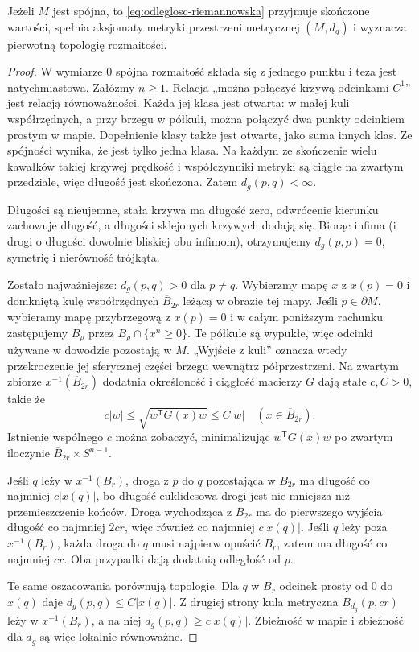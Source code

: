 \begin{twierdzenie}
\label{thm:odleglosc-jest-metryka}
Jeżeli $M$ jest spójna, to \eqref{eq:odleglosc-riemannowska}
przyjmuje skończone wartości, spełnia aksjomaty
metryki przestrzeni metrycznej $(M,d_g)$
i wyznacza pierwotną topologię rozmaitości.
\end{twierdzenie}
\begin{proof}
W wymiarze $0$ spójna rozmaitość składa się z jednego
punktu i teza jest natychmiastowa. Załóżmy $n\geq1$.
Relacja „można połączyć krzywą odcinkami $C^1$” jest
relacją równoważności. Każda jej klasa jest otwarta:
w małej kuli współrzędnych, a przy brzegu w półkuli,
można połączyć dwa punkty odcinkiem prostym w mapie.
Dopełnienie klasy także jest otwarte, jako suma innych
klas. Ze spójności wynika, że jest tylko jedna klasa.
Na każdym ze skończenie wielu kawałków takiej krzywej
prędkość i współczynniki metryki są ciągłe na zwartym
przedziale, więc długość jest skończona.
Zatem $d_g(p,q)<\infty$.

Długości są nieujemne, stała krzywa ma
długość zero, odwrócenie kierunku zachowuje
długość, a długości sklejonych krzywych
dodają się. Biorąc infima (i drogi o długości
dowolnie bliskiej obu infimom), otrzymujemy
$d_g(p,p)=0$, symetrię i nierówność trójkąta.

Zostało najważniejsze: $d_g(p,q)>0$ dla $p\ne q$.
Wybierzmy mapę $x$ z $x(p)=0$ i domkniętą
kulę współrzędnych $\overline B_{2r}$ leżącą
w obrazie tej mapy. Jeśli $p\in\partial M$, wybieramy
mapę przybrzegową z $x(p)=0$ i w całym poniższym
rachunku zastępujemy $B_\rho$ przez
$B_\rho\cap\{x^n\geq0\}$. Te półkule są wypukłe,
więc odcinki używane w dowodzie pozostają w $M$.
„Wyjście z kuli” oznacza wtedy przekroczenie jej
sferycznej części brzegu wewnątrz półprzestrzeni.
Na zwartym zbiorze
$x^{-1}(\overline B_{2r})$ dodatnia określoność
i ciągłość macierzy $G$ dają stałe $c,C>0$,
takie że
\[
 c|w|\leq\sqrt{w^{\mathsf T}G(x)w}\leq C|w|
 \quad (x\in\overline B_{2r}).
\]
Istnienie wspólnego $c$ można zobaczyć,
minimalizując $w^{\mathsf T}G(x)w$ po zwartym
iloczynie $\overline B_{2r}\times S^{n-1}$.

Jeśli $q$ leży w $x^{-1}(B_r)$, droga z $p$
do $q$ pozostająca w $B_{2r}$ ma długość
co najmniej $c|x(q)|$, bo długość euklidesowa
drogi jest nie mniejsza niż przemieszczenie
końców. Droga wychodząca z $B_{2r}$ ma do
pierwszego wyjścia długość co najmniej $2cr$,
więc również co najmniej $c|x(q)|$.
Jeśli $q$ leży poza $x^{-1}(B_r)$, każda droga
do $q$ musi najpierw opuścić $B_r$, zatem
ma długość co najmniej $cr$. Oba przypadki
dają dodatnią odległość od $p$.

Te same oszacowania porównują topologie.
Dla $q$ w $B_r$ odcinek prosty od $0$ do $x(q)$
daje $d_g(p,q)\leq C|x(q)|$.
Z drugiej strony kula metryczna
$B_{d_g}(p,cr)$ leży w $x^{-1}(B_r)$,
a na niej $d_g(p,q)\geq c|x(q)|$.
Zbieżność w mapie i zbieżność dla $d_g$
są więc lokalnie równoważne.
\end{proof}

